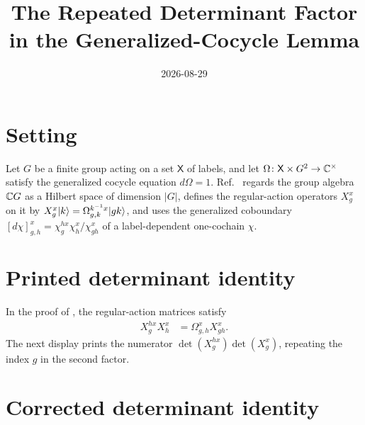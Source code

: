 \documentclass{article}
\title{The Repeated Determinant Factor in the Generalized-Cocycle Lemma}
\author{}
\date{2026-08-29}
\begin{document}
\maketitle
{}

\section{Setting}

Let $G$ be a finite group acting on a set $\mathsf X$ of labels, and let
$\Omega\colon\mathsf X\times G^2\to\mathbb{C}^\times$ satisfy the generalized cocycle
equation $d\Omega=1$.
Ref.~\cite[Lemma~\texttt{lemma:G\_cocycle}]{FrancoRubio2025MPUGauging} regards
the group algebra $\mathbb{C} G$ as a Hilbert space of dimension $|G|$, defines the
regular-action operators $X^x_g$ on it by
$X^x_g|k\rangle=\Omega^{k^{-1}x}_{g,k}|gk\rangle$, and uses the generalized
coboundary $[d\chi]^x_{g,h}=\chi^{h x}_g\chi^x_h/\chi^x_{gh}$ of a
label-dependent one-cochain $\chi$.

\section{Printed determinant identity}

In the proof of \cite[Lemma~\texttt{lemma:G\_cocycle}]{FrancoRubio2025MPUGauging},
the regular-action matrices satisfy
\begin{align}
    X^{h x}_g X^x_h
        &=\Omega^x_{g,h}X^x_{gh}.
    \label{eq:fbc25_generalized_cocycle_operator}
\end{align}
The next display prints the numerator
$\det(X^{h x}_g)\det(X^x_g)$, repeating the index $g$ in the second factor.

\section{Corrected determinant identity}
\end{document}

